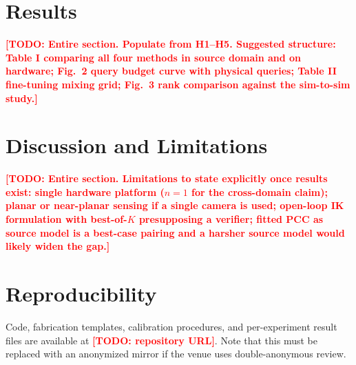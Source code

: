 \documentclass[letterpaper, 10pt, conference]{ieeeconf}
\newcommand{\todo}[1]{\textcolor{red}{\textbf{[TODO: #1]}}}
\begin{document}
\section{Results}
\label{sec:results}

\todo{Entire section. Populate from H1--H5. Suggested structure: Table I
comparing all four methods in source domain and on hardware; Fig.~2 query
budget curve with physical queries; Table II fine-tuning mixing grid;
Fig.~3 rank comparison against the sim-to-sim study.}

\section{Discussion and Limitations}

\todo{Entire section. Limitations to state explicitly once results exist:
single hardware platform ($n{=}1$ for the cross-domain claim); planar or
near-planar sensing if a single camera is used; open-loop IK formulation with
best-of-$K$ presupposing a verifier; fitted PCC as source model is a
best-case pairing and a harsher source model would likely widen the gap.}

\section*{Reproducibility}

Code, fabrication templates, calibration procedures, and per-experiment
result files are available at \todo{repository URL}. Note that this must be
replaced with an anonymized mirror if the venue uses double-anonymous review.
\end{document}
